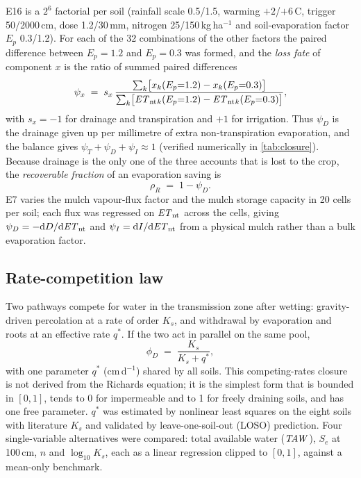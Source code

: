 \documentclass[review,12pt,authoryear]{elsarticle}
\begin{document}
E16 is a $2^6$ factorial per soil (rainfall scale 0.5/1.5, warming $+2$/$+6$\,\textdegree C, trigger 50/2000\,cm, dose 1.2/30\,mm, nitrogen 25/150\,kg\,ha$^{-1}$ and soil-evaporation factor $E_p$ 0.3/1.2). For each of the 32 combinations of the other factors the paired difference between $E_p=1.2$ and $E_p=0.3$ was formed, and the \emph{loss fate} of component $x$ is the ratio of summed paired differences
\begin{equation}
\psi_x \;=\; s_x\,\frac{\sum_{k}\bigl[x_k(E_p{=}1.2)-x_k(E_p{=}0.3)\bigr]}{\sum_{k}\bigl[\mathit{ET}_{\mathrm{nt}}{}_k(E_p{=}1.2)-\mathit{ET}_{\mathrm{nt}}{}_k(E_p{=}0.3)\bigr]},
\label{eq:psi}
\end{equation}
with $s_x=-1$ for drainage and transpiration and $+1$ for irrigation. Thus $\psi_D$ is the drainage given up per millimetre of extra non-transpiration evaporation, and the balance gives $\psi_T+\psi_D+\psi_I\approx1$ (verified numerically in \cref{tab:closure}). Because drainage is the only one of the three accounts that is lost to the crop, the \emph{recoverable fraction} of an evaporation saving is
\begin{equation}
\rho_R \;=\; 1-\psi_D .
\label{eq:rec}
\end{equation}
E7 varies the mulch vapour-flux factor and the mulch storage capacity in 20 cells per soil; each flux was regressed on $\mathit{ET}_{\mathrm{nt}}$ across the cells, giving $\psi_D=-\mathrm{d}D/\mathrm{d}\mathit{ET}_{\mathrm{nt}}$ and $\psi_I=\mathrm{d}I/\mathrm{d}\mathit{ET}_{\mathrm{nt}}$ from a physical mulch rather than a bulk evaporation factor.

\subsection{Rate-competition law}
\label{sec:ratelaw}
Two pathways compete for water in the transmission zone after wetting: gravity-driven percolation at a rate of order $K_s$, and withdrawal by evaporation and roots at an effective rate $q^\ast$. If the two act in parallel on the same pool,
\begin{equation}
\phi_D \;=\; \frac{K_s}{K_s+q^\ast},
\label{eq:rate}
\end{equation}
with one parameter $q^\ast$ (cm\,d$^{-1}$) shared by all soils. This competing-rates closure is not derived from the Richards equation; it is the simplest form that is bounded in $[0,1]$, tends to 0 for impermeable and to 1 for freely draining soils, and has one free parameter. $q^\ast$ was estimated by nonlinear least squares on the eight soils with literature $K_s$ and validated by leave-one-soil-out (LOSO) prediction. Four single-variable alternatives were compared: total available water ($\mathit{TAW}$), $S_e$ at 100\,cm, $n$ and $\log_{10}K_s$, each as a linear regression clipped to $[0,1]$, against a mean-only benchmark.
\end{document}
